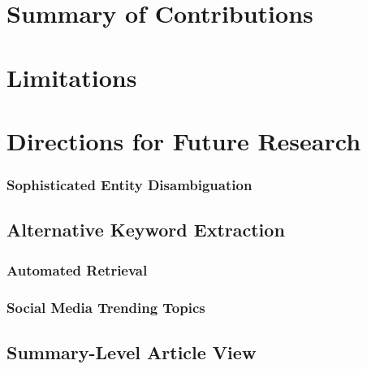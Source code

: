 \section{Summary of Contributions}

\section{Limitations}

\section{Directions for Future Research}


\subsubsection{Sophisticated Entity Disambiguation}

\subsection{Alternative Keyword Extraction}

\subsubsection{Automated Retrieval}

\subsubsection{Social Media Trending Topics}

\subsection{Summary-Level Article View}